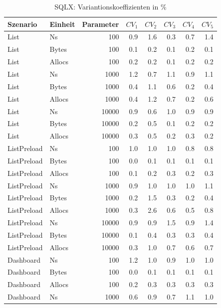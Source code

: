 
\begin{table}[ht]
\setlength{\extrarowheight}{-1pt}
\centering
\caption{SQLX: Variantionskoeffizienten in \%}
\begin{tabular}{llrrrrrr}
\toprule
Szenario & Einheit & Parameter & ${CV_1}$ & ${CV_2}$ & ${CV_3}$& ${CV_4}$ & ${CV_5}$ \\
\midrule
	List & Ns & 100 &  0.9 &  1.6 &  0.3 &  0.7 &  1.4 \\
	List & Bytes & 100 &  0.1 &  0.2 &  0.1 &  0.2 &  0.1 \\
	List & Allocs & 100 &  0.2 &  0.2 &  0.1 &  0.2 &  0.2 \\
	List & Ns & 1000 &  1.2 &  0.7 &  1.1 &  0.9 &  1.1 \\
	List & Bytes & 1000 &  0.4 &  1.1 &  0.6 &  0.2 &  0.4 \\
	List & Allocs & 1000 &  0.4 &  1.2 &  0.7 &  0.2 &  0.6 \\
	List & Ns & 10000 &  0.9 &  0.6 &  1.0 &  0.9 &  0.9 \\
	List & Bytes & 10000 &  0.2 &  0.5 &  0.1 &  0.2 &  0.2 \\
	List & Allocs & 10000 &  0.3 &  0.5 &  0.2 &  0.3 &  0.2 \\
	ListPreload & Ns & 100 &  1.0 &  1.0 &  1.0 &  0.8 &  0.8 \\
	ListPreload & Bytes & 100 &  0.0 &  0.1 &  0.1 &  0.1 &  0.1 \\
	ListPreload & Allocs & 100 &  0.1 &  0.2 &  0.3 &  0.2 &  0.3 \\
	ListPreload & Ns & 1000 &  0.9 &  1.0 &  1.0 &  1.0 &  1.1 \\
	ListPreload & Bytes & 1000 &  0.2 &  1.5 &  0.3 &  0.2 &  0.4 \\
	ListPreload & Allocs & 1000 &  0.3 & \cellcolor{red!11}  2.6 &  0.6 &  0.5 &  0.8 \\
	ListPreload & Ns & 10000 &  0.9 &  0.9 &  1.5 &  0.9 &  1.4 \\
	ListPreload & Bytes & 10000 &  0.1 &  0.4 &  0.3 &  0.3 &  0.4 \\
	ListPreload & Allocs & 10000 &  0.3 &  1.0 &  0.7 &  0.6 &  0.7 \\
	Dashboard & Ns & 100 &  1.2 &  1.0 &  0.9 &  1.0 &  1.0 \\
	Dashboard & Bytes & 100 &  0.0 &  0.1 &  0.1 &  0.1 &  0.1 \\
	Dashboard & Allocs & 100 &  0.2 &  0.3 &  0.3 &  0.3 &  0.3 \\
	Dashboard & Ns & 1000 &  0.6 &  0.9 &  0.7 &  1.1 &  1.0 \\

\end{tabular}
\end{table}
